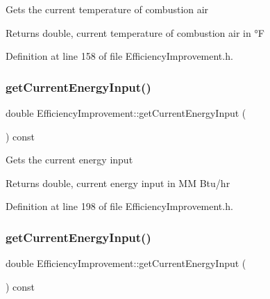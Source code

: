 Gets the current temperature of combustion air

\begin{DoxyReturn}{Returns}
double, current temperature of combustion air in °F 
\end{DoxyReturn}


Definition at line 158 of file Efficiency\+Improvement.\+h.

\mbox{\label{class_efficiency_improvement_a8fcbdd3085f0a8b1120fb699522fcc05}} 
\subsubsection{\texorpdfstring{get\+Current\+Energy\+Input()}{getCurrentEnergyInput()}\hspace{0.1cm}{\footnotesize\ttfamily [1/3]}}
{\footnotesize\ttfamily double Efficiency\+Improvement\+::get\+Current\+Energy\+Input (\begin{DoxyParamCaption}{ }\end{DoxyParamCaption}) const\hspace{0.3cm}{\ttfamily [inline]}}

Gets the current energy input

\begin{DoxyReturn}{Returns}
double, current energy input in MM Btu/hr 
\end{DoxyReturn}


Definition at line 198 of file Efficiency\+Improvement.\+h.

\mbox{\label{class_efficiency_improvement_a8fcbdd3085f0a8b1120fb699522fcc05}} 
\subsubsection{\texorpdfstring{get\+Current\+Energy\+Input()}{getCurrentEnergyInput()}\hspace{0.1cm}{\footnotesize\ttfamily [2/3]}}
{\footnotesize\ttfamily double Efficiency\+Improvement\+::get\+Current\+Energy\+Input (\begin{DoxyParamCaption}{ }\end{DoxyParamCaption}) const\hspace{0.3cm}{\ttfamily [inline]}}

